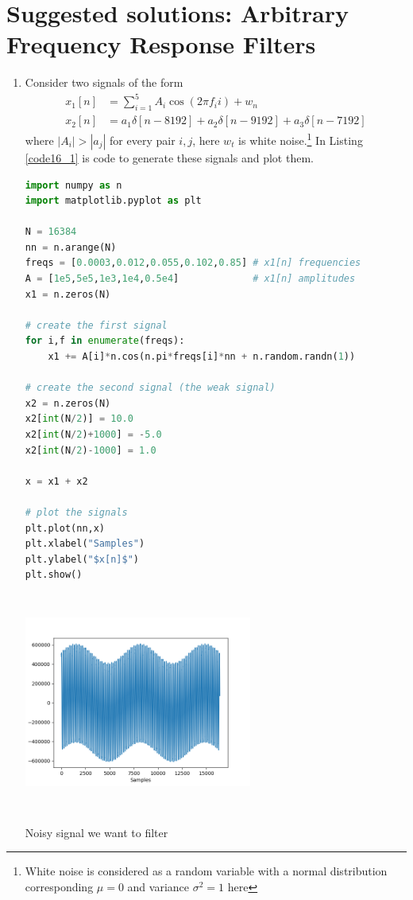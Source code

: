 \newpage
\section{Suggested solutions: Arbitrary Frequency Response Filters}
\begin{enumerate}
\item Consider two signals of the form
\begin{align*}
    x_{1}[n]&=\sum_{i=1}^{5}A_{i}\cos(2\pi f_{i}i)+w_{n} \\
    x_{2}[n]&=a_1\delta[n-8192] + a_2\delta[n-9192] + a_3\delta[n-7192]
\end{align*}
where $|A_{i}|>|a_{j}|$ for every pair $i,j$, here $w_t$ is white noise.\footnote{White noise is considered as a random variable with a normal distribution corresponding $\mu=0$ and variance $\sigma^{2}=1$ here} In Listing \ref{code16_1} is code to generate these signals and plot them. 
\begin{lstlisting}[language=Python, caption=Example signal code,label=code16_1]
import numpy as n
import matplotlib.pyplot as plt

N = 16384
nn = n.arange(N)
freqs = [0.0003,0.012,0.055,0.102,0.85] # x1[n] frequencies
A = [1e5,5e5,1e3,1e4,0.5e4]             # x1[n] amplitudes
x1 = n.zeros(N)

# create the first signal
for i,f in enumerate(freqs):
    x1 += A[i]*n.cos(n.pi*freqs[i]*nn + n.random.randn(1))

# create the second signal (the weak signal)
x2 = n.zeros(N)
x2[int(N/2)] = 10.0
x2[int(N/2)+1000] = -5.0
x2[int(N/2)-1000] = 1.0

x = x1 + x2

# plot the signals
plt.plot(nn,x)
plt.xlabel("Samples")
plt.ylabel("$x[n]$")
plt.show()
\end{lstlisting}

\begin{marginfigure}
    \centering
    \includegraphics[width=7.5cm,height=7.2cm]{ch17/figures/ex16_1.png}
    \caption{Noisy signal we want to filter}
    \label{fig16_1}
\end{marginfigure}


\end{enumerate}
